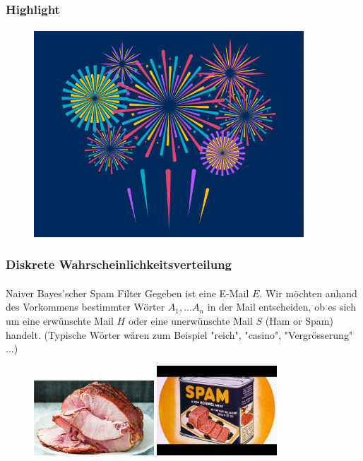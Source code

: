 \documentclass{beamer}
\begin{document}
\begin{frame}
    \frametitle{Highlight}
\framesubtitle{}
\begin{figure}[htp]
      \centering
    \includegraphics[width=0.9\textwidth]{img/firework}
\end{figure}
 \end{frame}


\begin{frame}
    \frametitle{Diskrete Wahrscheinlichkeitsverteilung}
\framesubtitle{}

\begin{block}{Naiver Bayes'scher Spam Filter}
Gegeben ist eine E-Mail $E$.  Wir möchten anhand des Vorkommens bestimmter Wörter $A_1, \ldots A_n$ in der Mail entscheiden, ob es sich um eine erwünschte Mail $H$ oder eine unerwünschte Mail $S$ (Ham or Spam) handelt. 
(Typische Wörter wären zum Beispiel "reich",  "casino", "Vergrösserung" ...)
\end{block}

\begin{figure}[htp]
      \centering
    \includegraphics[width=0.4\textwidth]{img/ham}
    \includegraphics[width=0.4\textwidth]{img/spam}

\end{figure}



 \end{frame}
\end{document}

